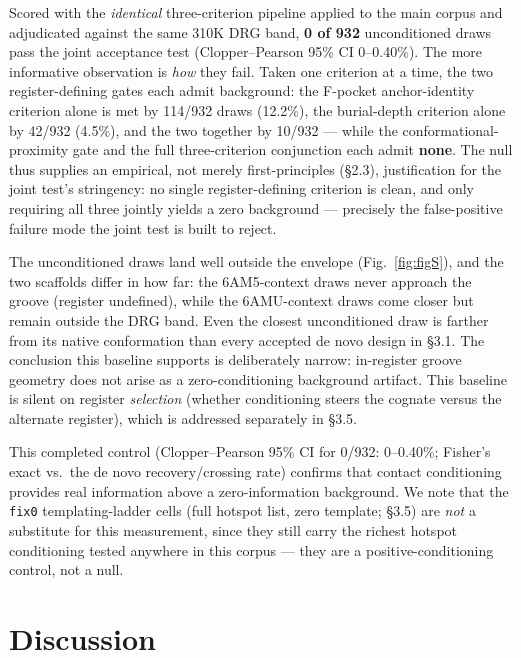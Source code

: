 \documentclass[letterpaper]{article}
\begin{document}
Scored with the \textit{identical} three-criterion pipeline applied to the main corpus and adjudicated
against the same 310K DRG band, \textbf{0 of 932} unconditioned draws pass the joint acceptance test
(Clopper--Pearson 95\% CI 0--0.40\%). The more informative observation is \textit{how} they fail. Taken one
criterion at a time, the two register-defining gates each admit background: the F-pocket anchor-identity
criterion alone is met by 114/932 draws (12.2\%), the burial-depth criterion alone by 42/932 (4.5\%), and
the two together by 10/932 --- while the conformational-proximity gate and the full three-criterion
conjunction each admit \textbf{none}. The null thus supplies an empirical, not merely first-principles
(\S2.3), justification for the joint test's stringency: no single register-defining criterion is clean, and
only requiring all three jointly yields a zero background --- precisely the false-positive failure mode the
joint test is built to reject.

The unconditioned draws land well outside the envelope (Fig.~\ref{fig:figS}), and the two scaffolds differ
in how far: the 6AM5-context draws never approach the groove (register undefined), while the 6AMU-context
draws come closer but remain outside the DRG band. Even the closest unconditioned draw is farther from its native
conformation than every accepted de novo design in \S3.1. The conclusion this baseline supports is
deliberately narrow: in-register groove geometry does not arise as a zero-conditioning background artifact.
This baseline is silent on register \textit{selection} (whether conditioning steers the cognate versus the
alternate register), which is addressed separately in \S3.5.

This completed control (Clopper--Pearson 95\% CI for 0/932: 0--0.40\%; Fisher's exact vs.\ the de novo
recovery/crossing rate) confirms that contact conditioning provides real
information above a zero-information background. We note that the \texttt{fix0} templating-ladder cells
(full hotspot list, zero template; \S3.5) are \textit{not} a substitute for this measurement, since they
still carry the richest hotspot conditioning tested anywhere in this corpus --- they are a
positive-conditioning control, not a null.

\section{Discussion}
\end{document}
